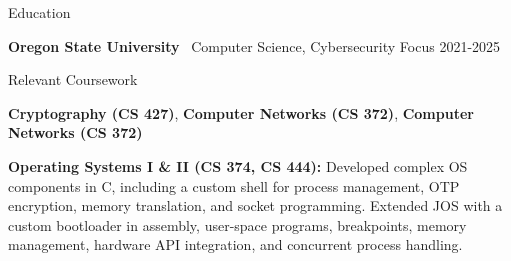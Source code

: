 \documentclass[5pt]{resume}
\begin{document}
\begin{rSection}{Education}
    \item \textbf{Oregon State University} \textbar\ Computer Science, Cybersecurity Focus \hfill 2021-2025
\end{rSection}

\begin{rSection}{Relevant Coursework}

    \item \textbf{Cryptography (CS 427)}, \textbf{Computer Networks (CS 372)}, \textbf{Computer Networks (CS 372)}
   \item \textbf{Operating Systems I \& II (CS 374, CS 444):} Developed complex OS components in C, including a custom shell for process management, OTP encryption, memory translation, and socket programming. Extended JOS with a custom bootloader in assembly, user-space programs, breakpoints, memory management, hardware API integration, and concurrent process handling.
\end{rSection}
\end{document}
